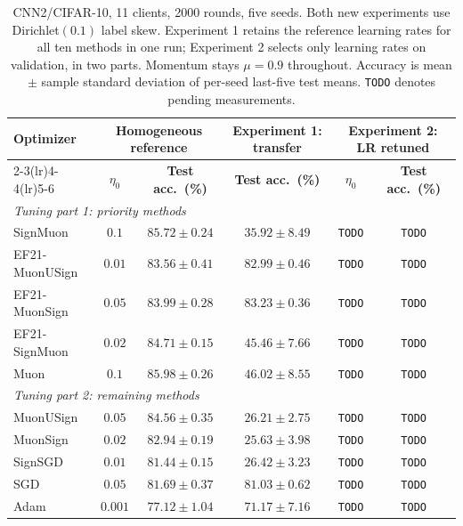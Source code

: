 \begin{table}[!t]
\centering
\footnotesize
\setlength{\tabcolsep}{5pt}
\renewcommand{\arraystretch}{1.1}
\begin{tabular}{@{}lccccc@{}}
\toprule
\multirow{2}{*}{\textbf{Optimizer}} &
\multicolumn{2}{c}{\textbf{Homogeneous reference}} &
\textbf{Experiment 1: transfer} &
\multicolumn{2}{c}{\textbf{Experiment 2: LR retuned}} \\
\cmidrule(lr){2-3}\cmidrule(lr){4-4}\cmidrule(lr){5-6}
& $\eta_0$ & \textbf{Test acc.\ (\%)} & \textbf{Test acc.\ (\%)} &
$\eta_0$ & \textbf{Test acc.\ (\%)} \\
\midrule
\multicolumn{6}{l}{\emph{Tuning part 1: priority methods}} \\
SignMuon & $0.1$ & $85.72\pm0.24$ & $35.92\pm8.49$ & \texttt{TODO} & \texttt{TODO} \\
EF21-MuonUSign & $0.01$ & $83.56\pm0.41$ & $82.99\pm0.46$ & \texttt{TODO} & \texttt{TODO} \\
EF21-MuonSign & $0.05$ & $83.99\pm0.28$ & $83.23\pm0.36$ & \texttt{TODO} & \texttt{TODO} \\
EF21-SignMuon & $0.02$ & $84.71\pm0.15$ & $45.46\pm7.66$ & \texttt{TODO} & \texttt{TODO} \\
Muon & $0.1$ & $85.98\pm0.26$ & $46.02\pm8.55$ & \texttt{TODO} & \texttt{TODO} \\
\midrule
\multicolumn{6}{l}{\emph{Tuning part 2: remaining methods}} \\
MuonUSign & $0.05$ & $84.56\pm0.35$ & $26.21\pm2.75$ & \texttt{TODO} & \texttt{TODO} \\
MuonSign & $0.02$ & $82.94\pm0.19$ & $25.63\pm3.98$ & \texttt{TODO} & \texttt{TODO} \\
SignSGD & $0.01$ & $81.44\pm0.15$ & $26.42\pm3.23$ & \texttt{TODO} & \texttt{TODO} \\
SGD & $0.05$ & $81.69\pm0.37$ & $81.03\pm0.62$ & \texttt{TODO} & \texttt{TODO} \\
Adam & $0.001$ & $77.12\pm1.04$ & $71.17\pm7.16$ & \texttt{TODO} & \texttt{TODO} \\
\bottomrule
\end{tabular}
\caption{CNN2/CIFAR-10, 11 clients, 2000 rounds, five seeds. Both new
experiments use Dirichlet$(0.1)$ label skew. Experiment 1 retains the
reference learning rates for all ten methods in one run; Experiment 2 selects
only learning rates on validation, in two parts. Momentum stays $\mu=0.9$
throughout. Accuracy is mean $\pm$ sample standard deviation of per-seed
last-five test means. \texttt{TODO} denotes pending measurements.}
\label{add:tab:heterogeneous}
\end{table}

